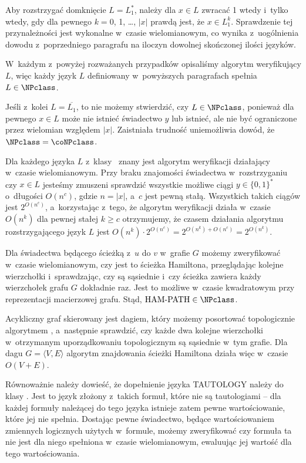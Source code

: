 Aby rozstrzygać domknięcie $L=L_1^*$, należy dla $x\in L$ zwracać 1 wtedy i~tylko wtedy, gdy dla pewnego $k=0$, 1, \dots, $|x|$ prawdą jest, że $x\in L_1^k$.
Sprawdzenie tej przynależności jest wykonalne w~czasie wielomianowym, co wynika z~uogólnienia dowodu z~poprzedniego paragrafu na iloczyn dowolnej skończonej ilości języków.

W~każdym z~powyżej rozważanych przypadków opisaliśmy algorytm weryfikujący $L$, więc każdy język $L$ definiowany w~powyższych paragrafach spełnia $L\in\NPclass$.

Jeśli z~kolei $L=\overline{L_1}$, to nie możemy stwierdzić, czy $L\in\NPclass$, ponieważ dla pewnego $x\in L$ może nie istnieć świadectwo $y$ lub istnieć, ale nie być ograniczone przez wielomian względem $|x|$.
Zaistniała trudność uniemożliwia dowód, że $\NPclass=\coNPclass$.

\exercise %
Dla każdego języka $L$ z~klasy \NPclass\ znany jest algorytm weryfikacji działający w~czasie wielomianowym.
Przy braku znajomości świadectwa w~rozstrzyganiu czy $x\in L$ jesteśmy zmuszeni sprawdzić wszystkie możliwe ciągi $y\in\{0,1\}^*$ o~długości $O(n^c)$, gdzie $n=|x|$, a~$c$ jest pewną stałą.
Wszystkich takich ciągów jest $2^{O(n^c)}$, a~korzystając z~tego, że algorytm weryfikacji działa w~czasie $O(n^k)$ dla pewnej stałej $k\ge c$ otrzymujemy, że czasem działania algorytmu rozstrzygającego język $L$ jest $O(n^k)\cdot2^{O(n^c)}=2^{O(n^k)+O(n^c)}=2^{O(n^k)}$.

\exercise %
Dla świadectwa będącego ścieżką z~$u$ do $v$ w~grafie $G$ możemy zweryfikować w~czasie wielomianowym, czy jest to ścieżka Hamiltona, przeglądając kolejne wierzchołki i~sprawdzając, czy są sąsiednie i~czy ścieżka zawiera każdy wierzchołek grafu $G$ dokładnie raz.
Jest to możliwe w~czasie kwadratowym przy reprezentacji macierzowej grafu.
Stąd, $\text{HAM-PATH}\in\NPclass$.

\exercise %
Acykliczny graf skierowany jest dagiem, który możemy posortować topologicznie algorytmem , a~następnie sprawdzić, czy każde dwa kolejne wierzchołki w~otrzymanym uporządkowaniu topologicznym są sąsiednie w~tym grafie.
Dla dagu $G=\langle V,E\rangle$ algorytm znajdowania ścieżki Hamiltona działa więc w~czasie $O(V+E)$.

\exercise %
Równoważnie należy dowieść, że dopełnienie języka TAUTOLOGY należy do klasy \NPclass.
Jest to język złożony z~takich formuł, które nie są tautologiami -- dla każdej formuły należącej do tego języka istnieje zatem pewne wartościowanie, które jej nie spełnia.
Dostając pewne świadectwo, będące wartościowaniem zmiennych logicznych użytych w~formule, możemy zweryfikować czy formuła ta nie jest dla niego spełniona w~czasie wielomianowym, ewaluując jej wartość dla tego wartościowania.

